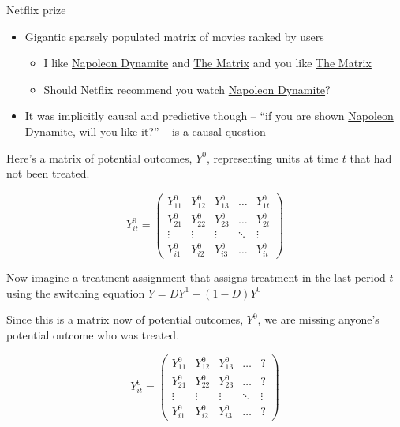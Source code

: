 \documentclass{beamer}
\begin{document}
\begin{frame}{Netflix prize}

\begin{itemize}
\item Gigantic sparsely populated matrix of movies ranked by users
	\begin{itemize}
	\item I like \underline{Napoleon Dynamite} and \underline{The Matrix} and you like \underline{The Matrix}
	\item Should Netflix recommend you watch \underline{Napoleon Dynamite}?
	\end{itemize}
\item It was implicitly causal and predictive though -- ``if you are shown \underline{Napoleon Dynamite}, will you like it?'' -- is a causal question
\end{itemize}

\end{frame}


\begin{frame}[plain]


Here's a matrix of potential outcomes, $Y^0$, representing units at time $t$ that had not been treated. 
\begin{center}
\[ Y^0_{it}  =\begin{pmatrix}
    Y^0_{11} & Y^0_{12} & Y^0_{13} & \dots  & Y^0_{1t} \\
    Y^0_{21} & Y^0_{22} & Y^0_{23} & \dots  & Y^0_{2t} \\
    \vdots & \vdots & \vdots & \ddots & \vdots \\
    Y^0_{i1} & Y^0_{i2} & Y^0_{i3} & \dots  & Y^0_{it}
\end{pmatrix}\]
\end{center}

Now imagine a treatment assignment that assigns treatment in the last period $t$ using the switching equation $Y=DY^1 + (1-D)Y^0$

\end{frame}

\begin{frame}[plain]

Since this is a matrix now of potential outcomes, $Y^0$, we are missing anyone's potential outcome who was treated. 

\begin{center}
\[ Y^0_{it}  =\begin{pmatrix}
    Y^0_{11} & Y^0_{12} & Y^0_{13} & \dots  & ? \\
    Y^0_{21} & Y^0_{22} & Y^0_{23} & \dots  & ? \\
    \vdots & \vdots & \vdots & \ddots & \vdots \\
    Y^0_{i1} & Y^0_{i2} & Y^0_{i3} & \dots  & ?
\end{pmatrix}\]
\end{center}



\end{frame}
\end{document}
